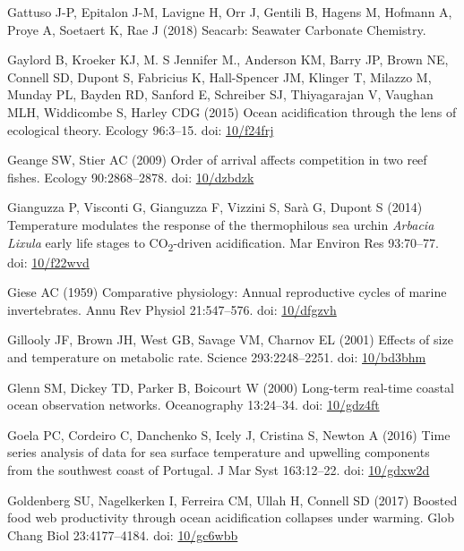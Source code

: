 \documentclass[a4paper,10pt, oneside]{memoir}
\begin{document}
\leavevmode\hypertarget{ref-Gattuso2018}{}%
Gattuso J-P, Epitalon J-M, Lavigne H, Orr J, Gentili B, Hagens M, Hofmann A, Proye A, Soetaert K, Rae J (2018) Seacarb: Seawater Carbonate Chemistry.

\leavevmode\hypertarget{ref-Gaylord2015}{}%
Gaylord B, Kroeker KJ, M. S Jennifer M., Anderson KM, Barry JP, Brown NE, Connell SD, Dupont S, Fabricius K, Hall-Spencer JM, Klinger T, Milazzo M, Munday PL, Bayden RD, Sanford E, Schreiber SJ, Thiyagarajan V, Vaughan MLH, Widdicombe S, Harley CDG (2015) Ocean acidification through the lens of ecological theory. Ecology 96:3--15. doi: \href{https://doi.org/10/f24frj}{10/f24frj}

\leavevmode\hypertarget{ref-Geange2009}{}%
Geange SW, Stier AC (2009) Order of arrival affects competition in two reef fishes. Ecology 90:2868--2878. doi: \href{https://doi.org/10/dzbdzk}{10/dzbdzk}

\leavevmode\hypertarget{ref-Gianguzza2014}{}%
Gianguzza P, Visconti G, Gianguzza F, Vizzini S, Sarà G, Dupont S (2014) Temperature modulates the response of the thermophilous sea urchin \emph{Arbacia} \emph{Lixula} early life stages to CO\textsubscript{2}-driven acidification. Mar Environ Res 93:70--77. doi: \href{https://doi.org/10/f22wvd}{10/f22wvd}

\leavevmode\hypertarget{ref-Giese1959}{}%
Giese AC (1959) Comparative physiology: Annual reproductive cycles of marine invertebrates. Annu Rev Physiol 21:547--576. doi: \href{https://doi.org/10/dfgzvh}{10/dfgzvh}

\leavevmode\hypertarget{ref-Gillooly2001}{}%
Gillooly JF, Brown JH, West GB, Savage VM, Charnov EL (2001) Effects of size and temperature on metabolic rate. Science 293:2248--2251. doi: \href{https://doi.org/10/bd3bhm}{10/bd3bhm}

\leavevmode\hypertarget{ref-Glenn2000}{}%
Glenn SM, Dickey TD, Parker B, Boicourt W (2000) Long-term real-time coastal ocean observation networks. Oceanography 13:24--34. doi: \href{https://doi.org/10/gdz4ft}{10/gdz4ft}

\leavevmode\hypertarget{ref-Goela2016}{}%
Goela PC, Cordeiro C, Danchenko S, Icely J, Cristina S, Newton A (2016) Time series analysis of data for sea surface temperature and upwelling components from the southwest coast of Portugal. J Mar Syst 163:12--22. doi: \href{https://doi.org/10/gdxw2d}{10/gdxw2d}

\leavevmode\hypertarget{ref-Goldenberg2017}{}%
Goldenberg SU, Nagelkerken I, Ferreira CM, Ullah H, Connell SD (2017) Boosted food web productivity through ocean acidification collapses under warming. Glob Chang Biol 23:4177--4184. doi: \href{https://doi.org/10/gc6wbb}{10/gc6wbb}
\end{document}
